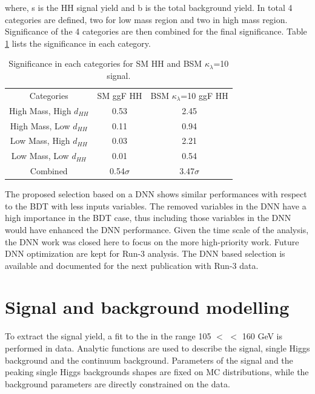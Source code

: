 where, s is the HH signal yield and b is the total background yield. In total 4 categories are defined, two for low mass region and two in high mass region. Significance of the 4 categories are then combined for the final significance. Table \ref{tab:Sig} lists the significance in each category. \\
\begin{table}[htbp]
    \centering
    \begin{tabular}{ccc}
        \hline\hline
        Categories & SM ggF HH & BSM $\kappa_\lambda$=10 ggF HH \\
        High Mass, High $d_{HH}$ & 0.53 & 2.45 \\
        High Mass, Low $d_{HH}$ & 0.11 & 0.94 \\
        Low Mass, High $d_{HH}$ & 0.03 & 2.21 \\
        Low Mass, Low $d_{HH}$ & 0.01 & 0.54 \\
        \hline
        Combined & 0.54$\sigma$ & 3.47$\sigma$ \\
        \hline
        \hline
    \end{tabular}
    \caption{Significance in each categories for SM HH and BSM $\kappa_\lambda$=10 signal.}
    \label{tab:Sig}
\end{table}
The proposed selection based on a DNN shows similar performances with respect to the BDT with less inputs variables. The removed variables in the DNN have a high importance in the BDT case, thus including those variables in the DNN would have enhanced the DNN performance. Given the time scale of the analysis, the DNN work was closed here to focus on the more high-priority work. Future DNN optimization are kept for Run-3 analysis. The DNN based selection is available and documented for the next publication with Run-3 data. \\

\section{Signal and background modelling}
\label{HHyybb:Modelling}

To extract the \HHyybb signal yield, a fit to the \myy in the range 105 $<$ \myy $<$ 160 GeV is performed in data. Analytic functions are used to describe the signal, single Higgs background and the continuum background. Parameters of the signal and the peaking single Higgs backgrounds shapes are fixed on MC distributions, while the background parameters are directly constrained on the data.   

